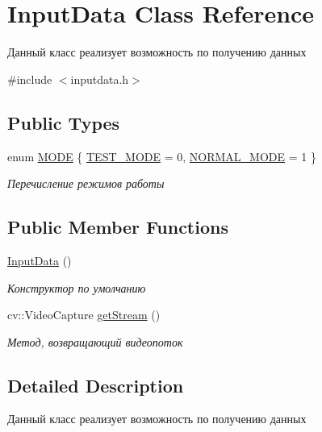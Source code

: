 \hypertarget{class_input_data}{\section{Input\+Data Class Reference}
\label{class_input_data}
}


Данный класс реализует возможность по получению данных  




{\ttfamily \#include $<$inputdata.\+h$>$}

\subsection*{Public Types}
\begin{DoxyCompactItemize}
\item 
enum \hyperlink{class_input_data_a04d4fa92c99784cb14411f2fb04a4f76}{M\+O\+D\+E} \{ \hyperlink{class_input_data_a04d4fa92c99784cb14411f2fb04a4f76a8e394a31cfc17f11fb169813baecd248}{T\+E\+S\+T\+\_\+\+M\+O\+D\+E} = 0, 
\hyperlink{class_input_data_a04d4fa92c99784cb14411f2fb04a4f76a5a830b428f1d0edbacb1588d3a7f446f}{N\+O\+R\+M\+A\+L\+\_\+\+M\+O\+D\+E} = 1
 \}
\begin{DoxyCompactList}\small\item\em Перечисление режимов работы \end{DoxyCompactList}\end{DoxyCompactItemize}
\subsection*{Public Member Functions}
\begin{DoxyCompactItemize}
\item 
\hyperlink{class_input_data_aff34c47ca0f425fb36c988f0e827a525}{Input\+Data} ()
\begin{DoxyCompactList}\small\item\em Конструктор по умолчанию \end{DoxyCompactList}\item 
cv\+::\+Video\+Capture \hyperlink{class_input_data_a22891368c82da2b69554c164f84b2450}{get\+Stream} ()
\begin{DoxyCompactList}\small\item\em Метод, возвращающий видеопоток \end{DoxyCompactList}\end{DoxyCompactItemize}


\subsection{Detailed Description}
Данный класс реализует возможность по получению данных 

